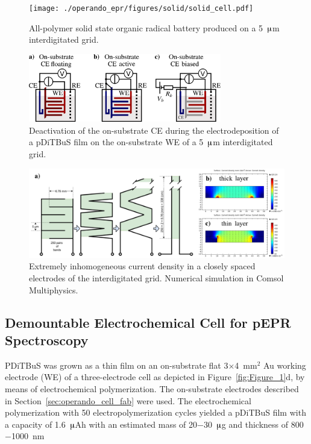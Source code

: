 \begin{figure}[h]
\center
	\texttt{[image: ./operando\_epr/figures/solid/solid\_cell.pdf]}
	\caption{All-polymer solid state organic radical battery produced on a 5~$\muup$m interdigitated grid.}
	\label{fig:transistor_battery_assewmbly}
\end{figure}


\begin{figure}[h]
\center
	\includegraphics[width=0.75\textwidth]{./operando_epr/figures/solid/separate_deposition.pdf}
	\caption{Deactivation of the on-substrate CE during the electrodeposition of a pDiTBuS film on the on-substrate WE of a 5~$\muup$m interdigitated grid.}
	\label{fig:transistor_battery_deposition}
\end{figure}

\begin{figure}[h]
\center
	\includegraphics[width=1\textwidth]{./operando_epr/figures/solid/current_density.pdf}
	\caption{Extremely inhomogeneous current density in a closely spaced electrodes of the interdigitated grid. Numerical simulation in Comsol Multiphysics.}
	\label{fig:grid_current_density_sumulation}
\end{figure}



\subsection{Demountable Electrochemical Cell for pEPR Spectroscopy}
\label{fab:ex_situ_charging}



PDiTBuS was grown as a thin film on an on-substrate flat 3$\times$4~mm$^2$ Au working electrode (WE) of a three-electrode cell as depicted in Figure~\ref{fig:Figure_1}d, by means of electrochemical polymerization. The on-substrate electrodes described in Section~\ref{sec:operando_cell_fab} were used. The electrochemical polymerization with 50 electropolymerization cycles yielded a pDiTBuS film with a capacity of 1.6~$\muup$Ah with an estimated mass of 20$-$30~$\muup$g and thickness of 800$-$1000~nm \\

